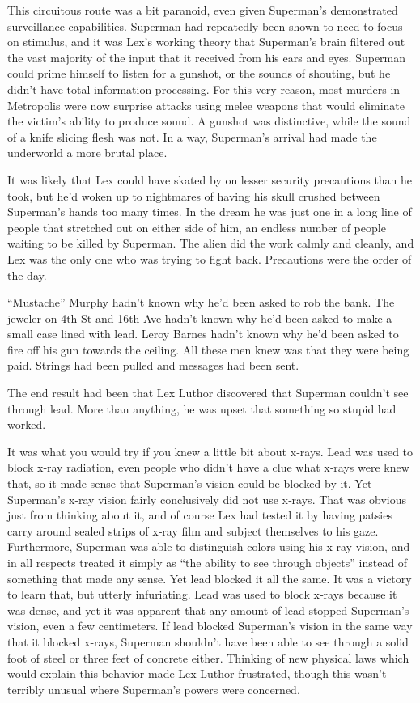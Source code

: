 This circuitous route was a bit paranoid, even given Superman's
demonstrated surveillance capabilities. Superman had repeatedly been
shown to need to focus on stimulus, and it was Lex's working theory that
Superman's brain filtered out the vast majority of the input that it
received from his ears and eyes. Superman could prime himself to listen
for a gunshot, or the sounds of shouting, but he didn't have total
information processing. For this very reason, most murders in Metropolis
were now surprise attacks using melee weapons that would eliminate the
victim's ability to produce sound. A gunshot was distinctive, while the
sound of a knife slicing flesh was not. In a way, Superman's arrival had
made the underworld a more brutal place.

It was likely that Lex could have skated by on lesser security
precautions than he took, but he'd woken up to nightmares of having his
skull crushed between Superman's hands too many times. In the dream he
was just one in a long line of people that stretched out on either side
of him, an endless number of people waiting to be killed by Superman.
The alien did the work calmly and cleanly, and Lex was the only one who
was trying to fight back. Precautions were the order of the day.

``Mustache'' Murphy hadn't known why he'd been asked to rob the bank.
The jeweler on 4th St and 16th Ave hadn't known why he'd been asked to
make a small case lined with lead. Leroy Barnes hadn't known why he'd
been asked to fire off his gun towards the ceiling. All these men knew
was that they were being paid. Strings had been pulled and messages had
been sent.

The end result had been that Lex Luthor discovered that Superman
couldn't see through lead. More than anything, he was upset that
something so stupid had worked.

It was what you would try if you knew a little bit about x‐rays. Lead
was used to block x‐ray radiation, even people who didn't have a clue
what x‐rays were knew that, so it made sense that Superman's vision
could be blocked by it. Yet Superman's x‐ray vision fairly conclusively
did not use x‐rays. That was obvious just from thinking about it, and of
course Lex had tested it by having patsies carry around sealed strips of
x‐ray film and subject themselves to his gaze. Furthermore, Superman was
able to distinguish colors using his x‐ray vision, and in all respects
treated it simply as ``the ability to see through objects'' instead of
something that made any sense. Yet lead blocked it all the same. It was
a victory to learn that, but utterly infuriating. Lead was used to block
x‐rays because it was dense, and yet it was apparent that any amount of
lead stopped Superman's vision, even a few centimeters. If lead blocked
Superman's vision in the same way that it blocked x‐rays, Superman
shouldn't have been able to see through a solid foot of steel or three
feet of concrete either. Thinking of new physical laws which would
explain this behavior made Lex Luthor frustrated, though this wasn't
terribly unusual where Superman's powers were concerned.

